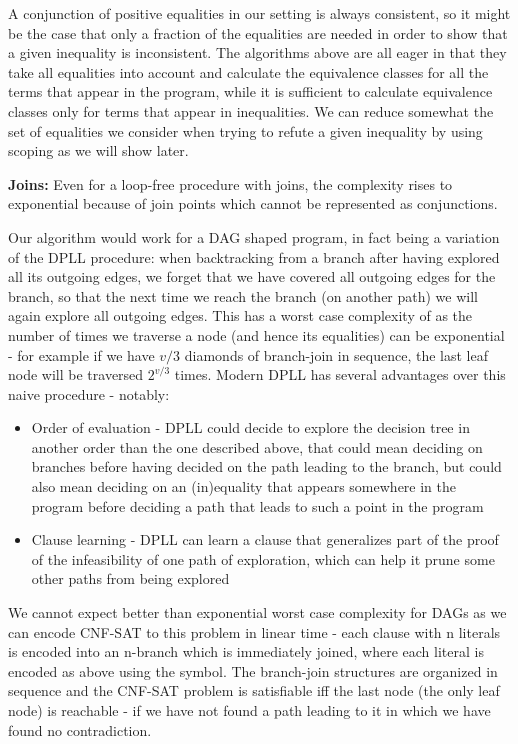A conjunction of positive equalities in our setting is always consistent, so it might be the case that only a fraction of the equalities are needed in order to show that a given inequality is inconsistent. The algorithms above are all eager in that they take all equalities into account and calculate the equivalence classes for all the terms that appear in the program, while it is sufficient to calculate equivalence classes only for terms that appear in inequalities. 
We can reduce somewhat the set of equalities we consider when trying to refute a given inequality by using scoping as we will show later.

\textbf{Joins:}
Even for a loop-free procedure with joins, the complexity rises to exponential because of join points which cannot be represented as conjunctions.

Our algorithm would work for a DAG shaped program, in fact being a variation of the DPLL procedure:  when backtracking from a branch after having explored all its outgoing edges, we forget that we have covered all outgoing edges for the branch, so that the next time we reach the branch (on another path) we will again explore all outgoing edges.
This has a worst case complexity of  as the number of times we traverse a node (and hence its equalities) can be exponential - for example if we have $v/3$ diamonds of branch-join in sequence, the last leaf node will be traversed $2^{v/3}$ times.
Modern DPLL has several advantages over this naive procedure - notably:
\begin{itemize}
	\item Order of evaluation - DPLL could decide to explore the decision tree in another order than the one described above, that could mean deciding on branches before having decided on the path leading to the branch, but could also mean deciding on an (in)equality that appears somewhere in the program before deciding a path that leads to such a point in the program
	\item Clause learning - DPLL can learn a clause that generalizes part of the proof of the infeasibility of one path of exploration, 
	which can help it prune some other paths from being explored
\end{itemize}
We cannot expect better than exponential worst case complexity for DAGs as we can encode CNF-SAT to this problem in linear time - each clause with n literals is encoded into an n-branch which is immediately joined, where each literal is encoded as above using the  symbol.
The branch-join structures are organized in sequence and the CNF-SAT problem is satisfiable iff the last node (the only leaf node) is reachable - if we have not found a path leading to it in which we have found no contradiction.


